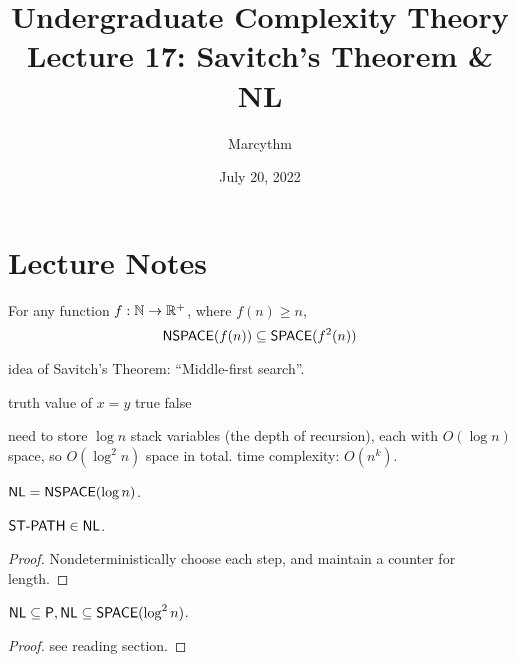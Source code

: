 \documentclass{article}
\title{Undergraduate Complexity Theory \\ Lecture 17: Savitch's Theorem \& NL}
\author{Marcythm}
\date{July 20, 2022}
\begin{document}
\maketitle{}

\section{Lecture Notes}

\begin{theorem}
  For any function \(f: \mathbb N \to \mathbb R^+\), where \(f(n) \geq n\),
  \[ \text{\sf NSPACE}(f(n)) \subseteq \text{\sf SPACE}(f^2(n)) \]
\end{theorem}

idea of Savitch's Theorem: ``Middle-first search''.

\begin{algorithm}
  \begin{algorithmic}
     
        \State \Return truth value of $x = y$
      \Else
            \State \Return true
          \EndIf
        \EndFor
      \EndIf
      \State \Return false
    \EndProcedure
  \end{algorithmic}
\end{algorithm}

need to store \(\log n\) stack variables (the depth of recursion), each with \(O(\log n)\) space, so \(O(\log^2 n)\) space in total. time complexity: \(O(n^k)\).

\begin{definition}
  \( \text{\sf NL} = \text{\sf NSPACE}(\log n)\).
\end{definition}

\begin{proposition}
  \( \text{\sf ST-PATH} \in \text{\sf NL} \).
\end{proposition}

\begin{proof}
  Nondeterministically choose each step, and maintain a counter for length.
\end{proof}

\begin{theorem}
  \( \text{\sf NL} \subseteq \text{\sf P}, \text{\sf NL} \subseteq \text{\sf SPACE}(\log^2 n)\).
\end{theorem}

\begin{proof}
  see reading section.
\end{proof}
\end{document}
